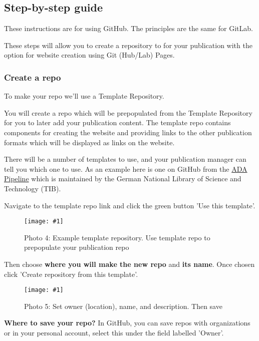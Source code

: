 \documentclass{article}
\newlength{\imgwidth}
\newcommand\scaledgraphics[2]{%
                
\settowidth{\imgwidth}{\texttt{[image: \#1]}}%
                
\setlength{\imgwidth}{\minof{\imgwidth}{#2\textwidth}}%
                
\texttt{[image: \#1]}%
                
}
\begin{document}
\subsection{Step-by-step guide}\label{H1473428}



These instructions are for using GitHub. The principles are the same for GitLab.


These steps will allow you to create a repository to for your publication with the option for website creation using Git (Hub/Lab) Pages.


\subsubsection{Create a repo}\label{H2479402}



To make your repo we'll use a Template Repository.


You will create a repo which will be prepopulated from the Template Repository for you to later add your publication content. The template repo contains components for creating the website and providing links to the other publication formats which will be displayed as links on the website.


There will be a number of templates to use, and your publication manager can tell you which one to use. As an example here is one on GitHub from the \href{https://github.com/TIBHannover/ADA-Book-Template}{ADA Pipeline} which is maintained by the German National Library of Science and Technology (TIB).


Navigate to the template repo link and click the green button 'Use this template'.

\begin{figure}
\scaledgraphics{0ce6c9ea-6817-4c0d-b56b-93b0dcd88ac8.png}{1}
\caption*{Photo 4: Example template repository. Use template repo to prepopulate your publication repo}\label{F25312281}
\end{figure}


Then choose \textbf{where you will make the new repo} and \textbf{its name}. Once chosen click 'Create repository from this template'.

\begin{figure}
\scaledgraphics{e61a310c-a521-4f60-81ba-bdfacba7ef99.png}{1}
\caption*{Photo 5: Set owner (location), name, and description. Then save}\label{F25227021}
\end{figure}


\textbf{Where to save your repo?} In GitHub, you can save repos with organizations or in your personal account, select this under the field labelled 'Owner'.
\end{document}

